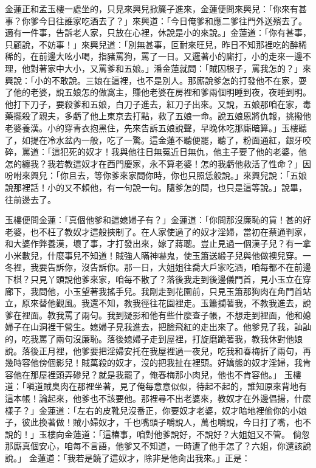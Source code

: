 \begin{showcontents}{}
金蓮正和孟玉樓一處坐的，只見來興兒掀簾子進來，金蓮便問來興兒：「你來有甚事？你爹今日往誰家吃酒去了？」來興道：「今日俺爹和應二爹往門外送殯去了。適有一件事，告訴老人家，只放在心裡，休說是小的來說。」金蓮道：「你有甚事，只顧說，不妨事！」來興兒道：「別無甚事，叵耐來旺兒，昨日不知那裡吃的醉稀稀的，在前邊大吆小喝，指豬罵狗，罵了一日。又邏著小的廝打，小的走來一邊不理，他對著家中大小，又罵爹和五娘。」潘金蓮就問：「賊囚根子，罵我怎的？」來興說：「小的不敢說。三娘在這裡，也不是別人。那廝說爹怎的打發他不在家，耍了他的老婆，說五娘怎的做窩主，賺他老婆在房裡和爹兩個明睡到夜，夜睡到明。他打下刀子，要殺爹和五娘，白刀子進去，紅刀子出來。又說，五娘那咱在家，毒藥擺殺了親夫，多虧了他上東京去打點，救了五娘一命。說五娘恩將仇報，挑撥他老婆養漢。小的穿青衣抱黑住，先來告訴五娘說聲，早晚休吃那廝暗算。」玉樓聽了，如提在冷水盆內一般，吃了一驚。這金蓮不聽便罷，聽了，粉面通紅，銀牙咬碎，罵道：「這犯死的奴才！我與他往日無冤近日無仇，他主子要了他的老婆，他怎的纏我？我若教這奴才在西門慶家，永不算老婆！怎的我虧他救活了性命？」因吩咐來興兒：「你且去，等你爹來家問你時，你也只照恁般說。」來興兒說：「五娘說那裡話！小的又不賴他，有一句說一句。隨爹怎的問，也只是這等說。」說畢，往前邊去了。

玉樓便問金蓮：「真個他爹和這媳婦子有？」金蓮道：「你問那沒廉恥的貨！甚的好老婆，也不枉了教奴才這般挾制了。在人家使過了的奴才淫婦，當初在蔡通判家，和大婆作弊養漢，壞了事，才打發出來，嫁了蔣聰。豈止見過一個漢子兒？有一拿小米數兒，什麼事兒不知道！賊強人瞞神嚇鬼，使玉簫送緞子兒與他做襖兒穿。一冬裡，我要告訴你，沒告訴你。那一日，大姐姐往喬大戶家吃酒，咱每都不在前邊下棋？只見丫頭說他爹來家，咱每不散了？落後我走到後邊儀門首，見小玉立在穿廊下，我問他，小玉望著我搖手兒。我剛走到花園前，只見玉簫那狗肉在角門首站立，原來替他觀風。我還不知，教我徑往花園裡走。玉簫攔著我，不教我進去，說爹在裡面。教我罵了兩句。我到疑影和他有些什麼查子帳，不想走到裡面，他和媳婦子在山洞裡干營生。媳婦子見我進去，把臉飛紅的走出來了。他爹見了我，訕訕的，吃我罵了兩句沒廉恥。落後媳婦子走到屋裡，打旋磨跪著我，教我休對他娘說。落後正月裡，他爹要把淫婦安托在我屋裡過一夜兒，吃我和春梅折了兩句，再幾時容他傍個影兒！賊萬殺的奴才，沒的把我扯在裡頭。好嬌態的奴才淫婦，我肯容他在那屋裡頭弄磣兒？就是我罷了，俺春梅那小肉兒，他也不肯容他。」 玉樓道：「嗔道賊臭肉在那裡坐著，見了俺每意意似似，待起不起的，誰知原來背地有這本帳！論起來，他爹也不該要他。那裡尋不出老婆來，教奴才在外邊倡揚，什麼樣子？」金蓮道：「左右的皮靴兒沒番正，你要奴才老婆，奴才暗地裡偷你的小娘子，彼此換著做！賊小婦奴才，千也嘴頭子嚼說人，萬也嚼說，今日打了嘴，也不說的！」玉樓向金蓮道：「這椿事，咱對他爹說好，不說好？大姐姐又不管。
倘忽那廝真個安心，咱每不言語，他爹又不知道，一時遭了他手怎了？六姐，你還該說說。」
金蓮道：「我若是饒了這奴才，除非是他肏出我來。」正是：


\end{showcontents}
